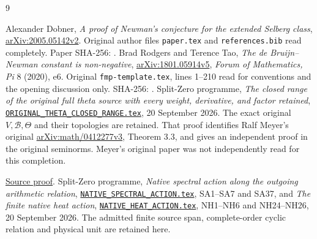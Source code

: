 \documentclass[11pt]{article}
\newcommand{\B}{\mathscr B}\newcommand{\Epi}{\mathscr E_\pi}
\begin{document}
\begin{thebibliography}{9}\raggedright
{} Alexander Dobner,
\emph{A proof of Newman's conjecture for the extended Selberg class},
\href{https://arxiv.org/abs/2005.05142v2}{arXiv:2005.05142v2}.
Original author files \texttt{paper.tex} and \texttt{references.bib}
read completely. Paper SHA-256:
.
 Brad Rodgers and Terence Tao,
\emph{The de Bruijn--Newman constant is non-negative},
\href{https://arxiv.org/abs/1801.05914v5}{arXiv:1801.05914v5},
\emph{Forum of Mathematics, Pi} 8 (2020), e6.
Original \texttt{fmp-template.tex}, lines 1--210 read for conventions
and the opening discussion only. SHA-256:
.
 Split-Zero programme,
\emph{The closed range of the original full theta source with every
weight, derivative, and factor retained},
\href{https://github.com/KokunoYumeto/zeta-function-research-reader/blob/5992ad50c0f2a06921f1fcaded7b4e38097c0739/workbenches/splitzero-tandem/continuations/20260920-original-kernel-mixed-determinants/providers/ORIGINAL_THETA_CLOSED_RANGE.tex\#L1}{\texttt{ORIGINAL\_THETA\_CLOSED\_RANGE.tex}}, 20 September 2026.
The exact original $V,\B,\Theta$ and their topologies are retained.
That proof identifies Ralf Meyer's original
\href{https://arxiv.org/abs/math/0412277v3}{arXiv:math/0412277v3},
Theorem 3.3, and gives an independent proof in the original seminorms.
Meyer's original paper was not independently read for this completion.

\href{https://github.com/KokunoYumeto/zeta-function-research-reader/blob/5992ad50c0f2a06921f1fcaded7b4e38097c0739/workbenches/splitzero-tandem/continuations/20260920-original-kernel-mixed-determinants/providers/ORIGINAL_THETA_CLOSED_RANGE.tex\#L1}{Source proof}.
 Split-Zero programme,
\emph{Native spectral action along the outgoing arithmetic relation},
\href{https://github.com/KokunoYumeto/zeta-function-research-reader/blob/5992ad50c0f2a06921f1fcaded7b4e38097c0739/workbenches/splitzero-tandem/continuations/20260920-original-kernel-mixed-determinants/providers/NATIVE_SPECTRAL_ACTION.tex\#L1}{\texttt{NATIVE\_SPECTRAL\_ACTION.tex}}, SA1--SA7 and SA37, and
\emph{The finite native heat action},
\href{https://github.com/KokunoYumeto/zeta-function-research-reader/blob/5992ad50c0f2a06921f1fcaded7b4e38097c0739/workbenches/splitzero-tandem/continuations/20260920-original-kernel-mixed-determinants/providers/NATIVE_HEAT_ACTION.tex\#L1}{\texttt{NATIVE\_HEAT\_ACTION.tex}}, NH1--NH6 and NH24--NH26,
20 September 2026. The admitted finite source span, complete-order
cyclic relation and physical unit are retained here.


\end{thebibliography}
\end{document}
